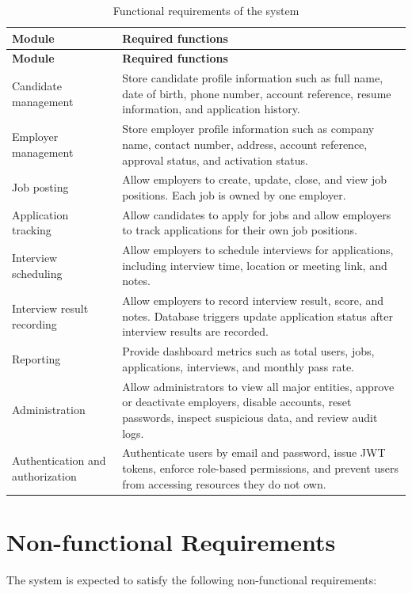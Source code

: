 \documentclass[12pt,a4paper]{report}
\begin{document}
\begin{longtable}{L{0.28\textwidth}L{0.62\textwidth}}
\caption{Functional requirements of the system}
\label{tab:functional-requirements}\\
\toprule
\textbf{Module} & \textbf{Required functions} \\
\midrule
\endfirsthead
\toprule
\textbf{Module} & \textbf{Required functions} \\
\midrule
\endhead
Candidate management & Store candidate profile information such as full name, date of birth, phone number, account reference, resume information, and application history. \\
Employer management & Store employer profile information such as company name, contact number, address, account reference, approval status, and activation status. \\
Job posting & Allow employers to create, update, close, and view job positions. Each job is owned by one employer. \\
Application tracking & Allow candidates to apply for jobs and allow employers to track applications for their own job positions. \\
Interview scheduling & Allow employers to schedule interviews for applications, including interview time, location or meeting link, and notes. \\
Interview result recording & Allow employers to record interview result, score, and notes. Database triggers update application status after interview results are recorded. \\
Reporting & Provide dashboard metrics such as total users, jobs, applications, interviews, and monthly pass rate. \\
Administration & Allow administrators to view all major entities, approve or deactivate employers, disable accounts, reset passwords, inspect suspicious data, and review audit logs. \\
Authentication and authorization & Authenticate users by email and password, issue JWT tokens, enforce role-based permissions, and prevent users from accessing resources they do not own. \\
\bottomrule
\end{longtable}

\section{Non-functional Requirements}

The system is expected to satisfy the following non-functional requirements:
\end{document}
